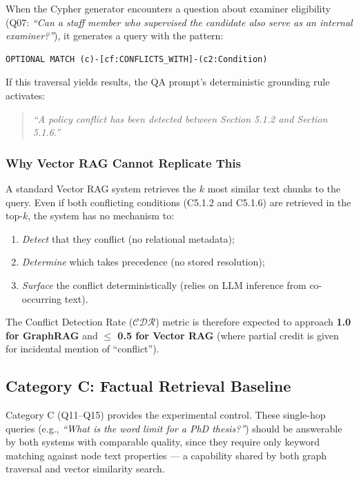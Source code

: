When the Cypher generator encounters a question about examiner eligibility (Q07: \textit{``Can a staff member who supervised the candidate also serve as an internal examiner?''}), it generates a query with the pattern:

\begin{verbatim}
OPTIONAL MATCH (c)-[cf:CONFLICTS_WITH]-(c2:Condition)
\end{verbatim}

If this traversal yields results, the QA prompt's deterministic grounding rule activates:
\begin{quote}
    \textit{``A policy conflict has been detected between Section 5.1.2 and Section 5.1.6.''}
\end{quote}

\subsubsection{Why Vector RAG Cannot Replicate This}

A standard Vector RAG system retrieves the $k$ most similar text chunks to the query. Even if both conflicting conditions (C5.1.2 and C5.1.6) are retrieved in the top-$k$, the system has no mechanism to:
\begin{enumerate}
    \item \textit{Detect} that they conflict (no relational metadata);
    \item \textit{Determine} which takes precedence (no stored resolution);
    \item \textit{Surface} the conflict deterministically (relies on LLM inference from co-occurring text).
\end{enumerate}

The Conflict Detection Rate ($\mathcal{CDR}$) metric is therefore expected to approach \textbf{1.0 for GraphRAG} and \textbf{$\leq$ 0.5 for Vector RAG} (where partial credit is given for incidental mention of ``conflict'').

\subsection{Category C: Factual Retrieval Baseline}

Category C (Q11--Q15) provides the experimental control. These single-hop queries (e.g., \textit{``What is the word limit for a PhD thesis?''}) should be answerable by both systems with comparable quality, since they require only keyword matching against node text properties — a capability shared by both graph traversal and vector similarity search.

